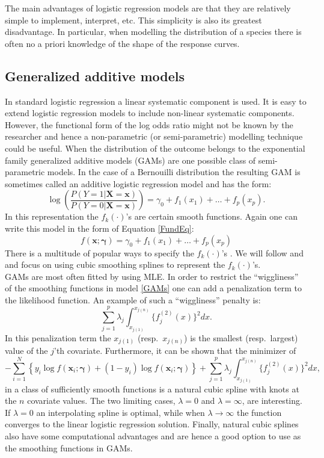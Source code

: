 The main advantages of logistic regression models are that they are relatively simple to implement, interpret, etc. This simplicity is also its greatest disadvantage. In particular, when modelling the distribution of a species there is often no a priori knowledge of the shape of the response curves.

\subsection{Generalized additive models}
\label{sec:GAM}
In standard logistic regression a linear systematic component is used. It is easy to extend logistic regression models to include non-linear systematic components. However, the functional form of the log odds ratio might not be known by the researcher and hence a non-parametric (or semi-parametric) modelling technique could be useful. When the distribution of the outcome belongs to the exponential family generalized additive models (GAMs) are one possible class of semi-parametric models. In the case of a Bernouilli distribution the resulting GAM is sometimes called an additive logistic regression model and has the form:
\begin{equation}
\label{GAMs}
\log \left( \frac{P(Y = 1|\bm{X} = \bm{x} )}{P(Y=0|\bm{X} = \bm{x})} \right) = \gamma_0 + f_1(x_{1}) + \dots + f_p(x_{p}).
\end{equation}
In this representation the $f_k(\cdot)$'s are certain smooth functions. Again one can write this model in the form of Equation \ref{FundEq}:
\[f(\bm{x};\bm{\gamma}) = \gamma_0 + f_1(x_{1}) + \dots + f_p(x_{p})\] 
There is a multitude of popular ways to specify the $f_k(\cdot)$'s \parencite{wood_generalized_2006, hastie_generalized_1990}. We will follow \cite{wood_generalized_2006} and \cite{wood_gams_2002} and focus on using cubic smoothing splines to represent the $f_k(\cdot)$'s. \\

GAMs are most often fitted by using MLE. In order to restrict the ``wiggliness'' of the smoothing functions in model \ref{GAMs} one can add a penalization term to the likelihood function. An example of such a ``wiggliness'' penalty is:
\[\sum_{j=1}^p \lambda_j \int_{x_{j(1)}}^{x_{j(n)}} \{f^{(2)}_j(x) \}^2dx.\]
In this penalization term the $x_{j(1)}$ (resp.\ $x_{j(n)}$) is the smallest (resp.\ largest) value of the $j$'th covariate. Furthermore, it can be shown that the minimizer of
\[- \sum_{i=1}^{N} \left\lbrace y_i \log{f(\bm{x}_i;\bm{\gamma})}  + (1-y_i)\log{f(\bm{x}_i;\bm{\gamma})} \right\rbrace + \sum_{j=1}^p \lambda_j \int_{x_{j(1)}}^{x_{j(n)}} \{f_j^{(2)}(x)\}^2 dx,\]
in a class of sufficiently smooth functions is a natural cubic spline with knots at the $n$ covariate values. The two limiting cases, $\lambda = 0$ and $\lambda = \infty$, are interesting. If $\lambda = 0$ an interpolating spline is optimal, while when $\lambda \to \infty$ the function converges to the linear logistic regression solution. Finally, natural cubic splines also have some computational advantages and are hence a good option to use as the smoothing functions in GAMs.\\

